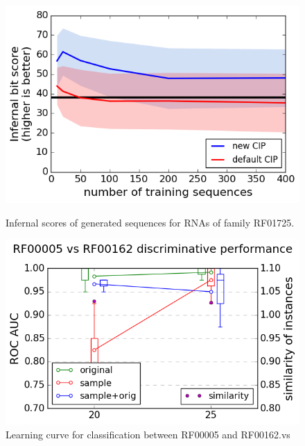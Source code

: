 \documentclass{article}
\begin{document}
\begin{figure}[ht]
      \centering
  \begin{minipage}[b]{0.49\textwidth}
    \includegraphics[width=\textwidth]{images/infernal_abstr.png}
    \caption{Infernal scores of generated sequences for RNAs of family RF01725.}
      \label{infeval}
  \end{minipage}
  \hfill
  \begin{minipage}[b]{0.49\textwidth}
    \includegraphics[width=\textwidth]{images/learningcurve.png}
    \caption{Learning curve for classification between RF00005 and RF00162.vs}
     \label{learncurve}
  \end{minipage}
\end{figure}


\end{document}
